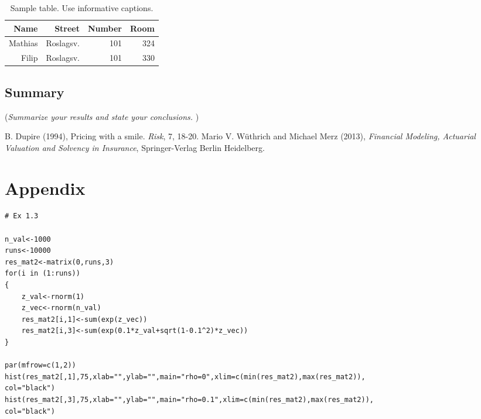 \documentclass[11pt]{article}
\begin{document}
\begin{table}[!ht]
\center
\begin{tabular}{rrr|r}
Name & Street & Number & Room\\ 
\hline
Mathias & Roslagsv. & 101 & 324\\
Filip & Roslagsv. & 101 & 330\\
\hline
\end{tabular}
\caption{Sample table. Use informative captions.} \label{tab:sampletab}
\end{table}




\subsection*{Summary}
({\it Summarize your results and state your conclusions. })



\begin{thebibliography}{99}
B. Dupire (1994),
Pricing with a smile.
\emph{Risk}, 7, 18-20.
  Mario V. W\"{u}thrich and Michael Merz (2013),
  \emph{Financial Modeling, Actuarial Valuation and Solvency in Insurance},
  Springer-Verlag Berlin Heidelberg.
\end{thebibliography}


\section*{Appendix}

\begin{verbatim}
# Ex 1.3

n_val<-1000
runs<-10000
res_mat2<-matrix(0,runs,3)
for(i in (1:runs))
{
	z_val<-rnorm(1)
	z_vec<-rnorm(n_val)
	res_mat2[i,1]<-sum(exp(z_vec))
	res_mat2[i,3]<-sum(exp(0.1*z_val+sqrt(1-0.1^2)*z_vec))
}

par(mfrow=c(1,2))
hist(res_mat2[,1],75,xlab="",ylab="",main="rho=0",xlim=c(min(res_mat2),max(res_mat2)),
col="black")
hist(res_mat2[,3],75,xlab="",ylab="",main="rho=0.1",xlim=c(min(res_mat2),max(res_mat2)),
col="black")
\end{verbatim}
\end{document}
